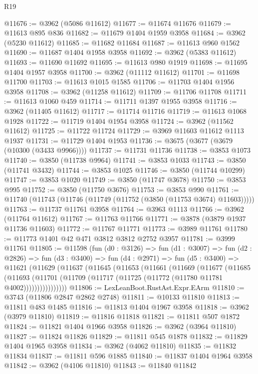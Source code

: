 \begin{lexlean}{R19}
\begin{coremodule}
@11676 := @3962 (@5086 @11612)
@11677 := @11674 @11676
@11679 := @11613 @895 @836
@11682 := @11679 @1404 @1959 @3958
@11684 := @3962 (@5230 @11612)
@11685 := @11682 @11684
@11687 := @11613 @960 @1562
@11690 := @11687 @1404 @1958 @3958
@11692 := @3962 (@5383 @11612)
@11693 := @11690 @11692
@11695 := @11613 @980 @1919
@11698 := @11695 @1404 @1957 @3958
@11700 := @3962 (@11112 @11612)
@11701 := @11698 @11700
@11703 := @11613 @1015 @1585
@11706 := @11703 @1404 @1956 @3958
@11708 := @3962 (@11258 @11612)
@11709 := @11706 @11708
@11711 := @11613 @1060 @459
@11714 := @11711 @1397 @1955 @3958
@11716 := @3962 (@11405 @11612)
@11717 := @11714 @11716
@11719 := @11613 @1068 @1928
@11722 := @11719 @1404 @1954 @3958
@11724 := @3962 (@11562 @11612)
@11725 := @11722 @11724
@11729 := @3969 @11603 @11612 @1113 @1937
@11731 := @11729 @1404 @1953
@11736 := @3675 (@3677 (@3679 (@10300 (@3433 @9966))))
@11737 := @11731 @11736
@11738 := @3853 @1073
@11740 := @3850 (@11738 @9964)
@11741 := @3853 @1033
@11743 := @3850 (@11741 @3432)
@11744 := @3853 @1025
@11746 := @3850 (@11744 @10299)
@11747 := @3853 @1020
@11749 := @3850 (@11747 @3678)
@11750 := @3853 @995
@11752 := @3850 (@11750 @3676)
@11753 := @3853 @990
@11761 := @11740 (@11743 (@11746 (@11749 (@11752 (@3850 (@11753 @3674) @11603)))))
@11763 := @11737 @11761 @3958
@11764 := @3963 @1113
@11766 := @3962 (@11764 @11612)
@11767 := @11763 @11766
@11771 := @3878 (@3879 @1937 @11736 @11603)
@11772 := @11767 @11771
@11773 := @3989 @11761
@11780 := @11773 @1401 @42 @471 @3812 @3812 @2752 @3957
@11781 := @3999 @11761
@11805 := @11598
    (fun (d0 : @3126) =>
    fun (d1 : @3007) =>
    fun (d2 : @2826) =>
    fun (d3 : @3400) =>
    fun (d4 : @2971) =>
    fun (d5 : @3400) =>
    @11621
      (@11629
        (@11637
          (@11645
            (@11653
              (@11661
                (@11669
                  (@11677
                    (@11685
                      (@11693
                        (@11701 (@11709 (@11717 (@11725 (@11772 (@11780 @11781 @4002))))))))))))))))
@11806 := LexLeanBoot.RustAst.Expr.EArm
@11810 := @3743 (@11806 @2847 @2862 @2748)
@11811 := @10133 @11810
@11813 := @11811 @483 @1485
@11816 := @11813 @1404 @1967 @3958
@11818 := @3962 (@3979 @11810)
@11819 := @11816 @11818
@11821 := @11811 @507 @1872
@11824 := @11821 @1404 @1966 @3958
@11826 := @3962 (@3964 @11810)
@11827 := @11824 @11826
@11829 := @11811 @545 @1878
@11832 := @11829 @1404 @1965 @3958
@11834 := @3962 (@4062 @11810)
@11835 := @11832 @11834
@11837 := @11811 @596 @1885
@11840 := @11837 @1404 @1964 @3958
@11842 := @3962 (@4106 @11810)
@11843 := @11840 @11842

\end{coremodule}
\end{lexlean}
